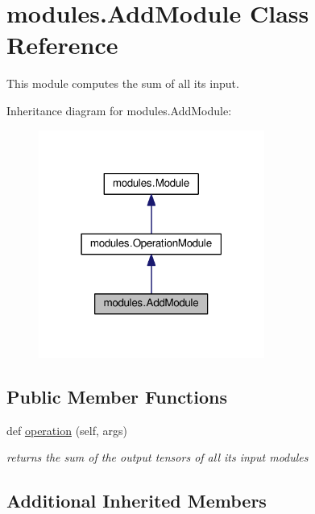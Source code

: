 \hypertarget{classmodules_1_1_add_module}{}\section{modules.\+Add\+Module Class Reference}
\label{classmodules_1_1_add_module}


This module computes the sum of all its input.  




Inheritance diagram for modules.\+Add\+Module\+:\nopagebreak
\begin{figure}[H]
\begin{center}
\leavevmode
\includegraphics[width=210pt]{classmodules_1_1_add_module__inherit__graph}
\end{center}
\end{figure}
\subsection*{Public Member Functions}
\begin{DoxyCompactItemize}
\item 
\mbox{\label{classmodules_1_1_add_module_a3876b3edcfd11f0a993288516ed62449}} 
def \hyperlink{classmodules_1_1_add_module_a3876b3edcfd11f0a993288516ed62449}{operation} (self, args)
\begin{DoxyCompactList}\small\item\em returns the sum of the output tensors of all its input modules \end{DoxyCompactList}\end{DoxyCompactItemize}
\subsection*{Additional Inherited Members}


